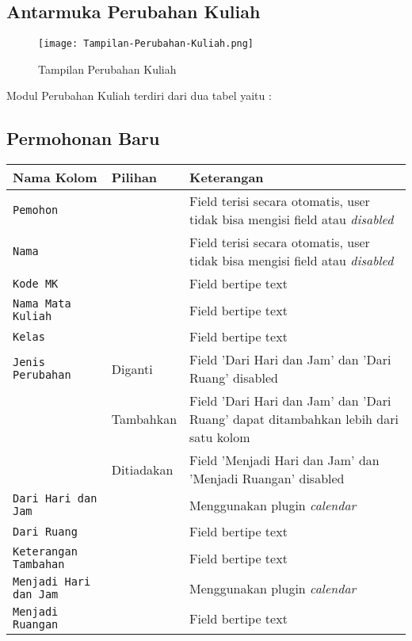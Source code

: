 \begin{enumerate}
 
\section{Antarmuka Perubahan Kuliah}
\begin{figure} [H]
	\centering  
	\texttt{[image: Tampilan-Perubahan-Kuliah.png]}  
	\caption{Tampilan Perubahan Kuliah} 
\end{figure}
Modul Perubahan Kuliah terdiri dari dua tabel yaitu :

\subsection{Permohonan Baru}

\begin{tabular}{ |p{4cm}|p{2cm}|p{10cm}|  }
	\hline
	Nama Kolom & Pilihan & Keterangan\\
	\hline
	\texttt{Pemohon} &  &Field terisi secara otomatis, user tidak bisa mengisi field atau \textit{disabled} \\
	\hline
	\texttt{Nama} &    & Field terisi secara otomatis, user tidak bisa mengisi field atau \textit{disabled}\\
	\hline
	\texttt{Kode MK } & & Field bertipe text \\
	\hline
	\texttt{Nama Mata Kuliah}    & & Field bertipe text \\
	\hline
	\texttt{Kelas} &  & Field bertipe text \\
	\hline
	\texttt{Jenis Perubahan} & Diganti &  Field 'Dari Hari dan Jam' dan 'Dari Ruang' disabled  \\
	 & Tambahkan &    Field 'Dari Hari dan Jam' dan 'Dari Ruang' dapat ditambahkan lebih dari satu kolom\\	 
	 & Ditiadakan &  Field 'Menjadi Hari dan Jam' dan 'Menjadi Ruangan' disabled   \\
	\hline
	\texttt{Dari Hari dan Jam} &  & Menggunakan plugin \textit{calendar} \\
	\hline
	\texttt{Dari Ruang} &  & Field bertipe text \\
	\hline
	\texttt{Keterangan Tambahan} &  & Field bertipe text \\
	\hline
	\texttt{Menjadi Hari dan Jam} &  & Menggunakan plugin \textit{calendar} \\
	\hline
	\texttt{Menjadi Ruangan} &  & Field bertipe text \\
	\hline
\end{tabular}


\end{enumerate}
